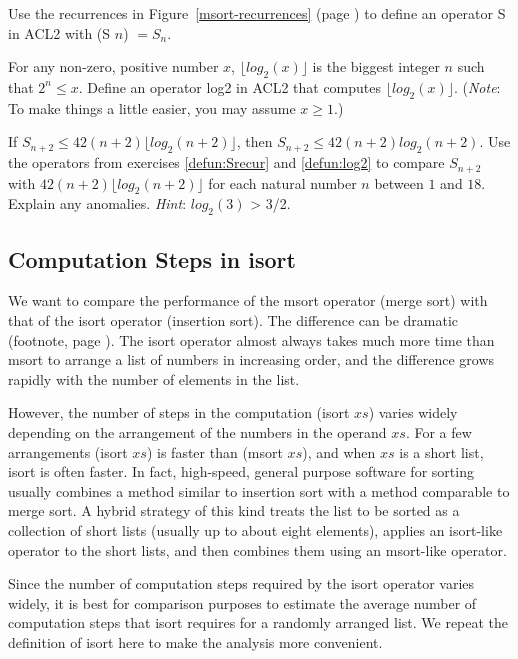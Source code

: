 \begin{ExerciseList}

\Exercise
\label{defun:Srecur}
Use the recurrences in Figure~\ref{msort-recurrences} (page \pageref{msort-recurrences})
to define an operator S in ACL2 with (S $n$) $= S_n$.

\Exercise
\label{defun:log2}
For any non-zero, positive number $x$, $\lfloor log_2(x)\rfloor$
is the biggest integer $n$ such that $2^n \leq x$.
Define an operator log2 in ACL2 that computes $\lfloor log_2(x)\rfloor$.
(\emph{Note}: To make things a little easier, you may assume $x \geq 1$.)

\Exercise
If $S_{n+2} \leq 42(n+2)\lfloor log_2(n+2)\rfloor$, then
$S_{n+2} \leq 42(n+2) log_2(n+2)$.
Use the operators from exercises \ref{defun:Srecur} and \ref{defun:log2}
to compare $S_{n+2}$ with $42(n+2)\lfloor log_2(n+2)\rfloor$
for each natural number $n$ between $1$ and $18$. Explain any anomalies.
\emph{Hint}: $log_2(3)$ > 3/2.

\end{ExerciseList}

\subsection{Computation Steps in isort}
\label{subsec:isort-steps}

We want to compare the performance of the msort operator (merge sort)
with that of the isort operator (insertion sort).
The difference can be dramatic
(footnote, page \pageref{bubble-vs-quicksort-example}).
The isort operator almost always takes much more time than msort
to arrange a list of numbers in increasing order,
and the difference grows rapidly with the number of elements in the list.

However, the number of steps in the computation (isort $xs$)
varies widely depending on the arrangement of the numbers in the operand $xs$.
For a few arrangements
(isort $xs$) is faster than (msort $xs$),
and when $xs$ is a short list, isort is often faster.
In fact, high-speed, general purpose software for sorting
usually combines a method similar to insertion sort
with a method comparable to merge sort.
A hybrid strategy of this kind treats
the list to be sorted as a collection of short lists
(usually up to about eight elements),
applies an isort-like operator to the short lists,
and then combines them
using an msort-like operator.

Since the number of computation steps required by the isort operator
varies widely, it is best for comparison purposes
to estimate the average number of computation steps that
isort requires for a randomly arranged list.
We repeat the definition of isort
here to make the analysis more convenient.

